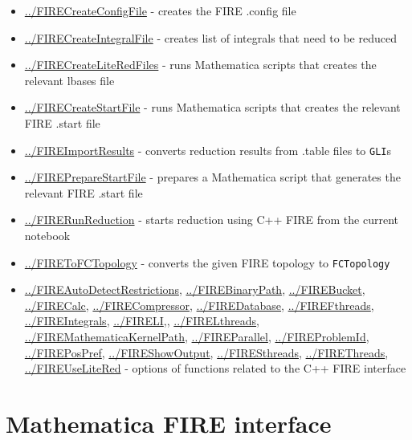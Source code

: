 \documentclass[../FeynHelpersManual.tex]{subfiles}
\begin{document}
\begin{itemize}
\tightlist
\item
  \hyperlink{../firecreateconfigfile}{../FIRECreateConfigFile} - creates
  the FIRE .config file
\item
  \hyperlink{../firecreateintegralfile}{../FIRECreateIntegralFile} -
  creates list of integrals that need to be reduced
\item
  \hyperlink{../firecreateliteredfiles}{../FIRECreateLiteRedFiles} -
  runs Mathematica scripts that creates the relevant lbases file
\item
  \hyperlink{../firecreatestartfile}{../FIRECreateStartFile} - runs
  Mathematica scripts that creates the relevant FIRE .start file
\item
  \hyperlink{../fireimportresults}{../FIREImportResults} - converts
  reduction results from .table files to \texttt{GLI}s
\item
  \hyperlink{../firepreparestartfile}{../FIREPrepareStartFile} -
  prepares a Mathematica script that generates the relevant FIRE .start
  file
\item
  \hyperlink{../firerunreduction}{../FIRERunReduction} - starts
  reduction using C++ FIRE from the current notebook
\item
  \hyperlink{../firetofctopology}{../FIREToFCTopology} - converts the
  given FIRE topology to \texttt{FCTopology}
\item
  \hyperlink{../fireautodetectrestrictions}{../FIREAutoDetectRestrictions},
  \hyperlink{../firebinarypath}{../FIREBinaryPath},
  \hyperlink{../firebucket}{../FIREBucket},
  \hyperlink{../firecalc}{../FIRECalc},
  \hyperlink{../firecompressor}{../FIRECompressor},
  \hyperlink{../firedatabase}{../FIREDatabase},
  \hyperlink{../firefthreads}{../FIREFthreads},
  \hyperlink{../fireintegrals}{../FIREIntegrals},
  \hyperlink{../fireli}{../FIRELI},,
  \hyperlink{../firelthreads}{../FIRELthreads},
  \hyperlink{../firemathematicakernelpath}{../FIREMathematicaKernelPath},
  \hyperlink{../fireparallel}{../FIREParallel},
  \hyperlink{../fireproblemid}{../FIREProblemId},
  \hyperlink{../firepospref}{../FIREPosPref},
  \hyperlink{../fireshowoutput}{../FIREShowOutput},
  \hyperlink{../firesthreads}{../FIRESthreads},
  \hyperlink{../firethreads}{../FIREThreads},
  \hyperlink{../fireuselitered}{../FIREUseLiteRed} - options of
  functions related to the C++ FIRE interface
\end{itemize}

\hypertarget{mathematica fire interface}{
\section{Mathematica FIRE interface}\label{mathematica fire interface}}
\end{document}
